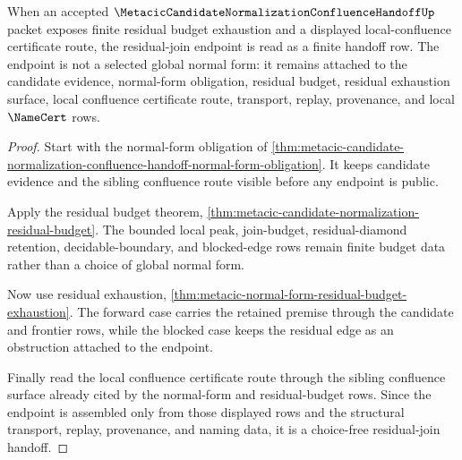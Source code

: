 \begin{theorem}
\label{thm:metacic-candidate-normalization-confluence-handoff-residual-join-choice-free}
When an accepted $\MetacicCandidateNormalizationConfluenceHandoffUp$ packet exposes finite residual budget exhaustion and a displayed local-confluence certificate route, the residual-join endpoint is read as a finite handoff row. The endpoint is not a selected global normal form: it remains attached to the candidate evidence, normal-form obligation, residual budget, residual exhaustion surface, local confluence certificate route, transport, replay, provenance, and local $\NameCert$ rows.
\end{theorem}
\begin{proof}
Start with the normal-form obligation of \autoref{thm:metacic-candidate-normalization-confluence-handoff-normal-form-obligation}. It keeps candidate evidence and the sibling confluence route visible before any endpoint is public.

Apply the residual budget theorem, \autoref{thm:metacic-candidate-normalization-residual-budget}. The bounded local peak, join-budget, residual-diamond retention, decidable-boundary, and blocked-edge rows remain finite budget data rather than a choice of global normal form.

Now use residual exhaustion, \autoref{thm:metacic-normal-form-residual-budget-exhaustion}. The forward case carries the retained premise through the candidate and frontier rows, while the blocked case keeps the residual edge as an obstruction attached to the endpoint.

Finally read the local confluence certificate route through the sibling confluence surface already cited by the normal-form and residual-budget rows. Since the endpoint is assembled only from those displayed rows and the structural transport, replay, provenance, and naming data, it is a choice-free residual-join handoff.
\end{proof}
